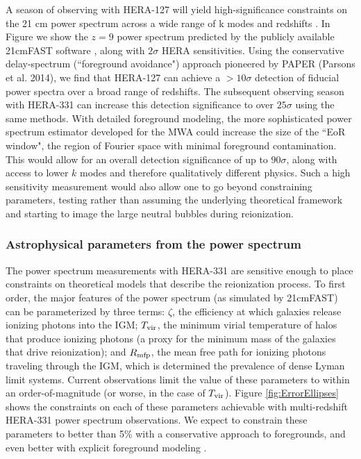 \documentclass[preprint]{aastex}
\begin{document}
A season of observing with HERA-127 will yield high-significance constraints on the 21 cm power spectrum across a wide range of k modes and redshifts \citep{pober_et_al2014}.  In Figure we show the $z=9$ power spectrum predicted by the publicly available 21cmFAST software \citep{mesinger_et_al2011}, along with $2\sigma$ HERA sensitivities.  Using the conservative delay-spectrum (``foreground avoidance") approach pioneered by PAPER (Parsons et al. 2014), we find that HERA-127 can achieve a $> 10\sigma$ detection of fiducial power spectra over a broad range of redshifts.  The subsequent observing season with HERA-331 can increase this detection significance to over $25\sigma$ using the same methods.  With detailed foreground modeling, the more sophisticated power spectrum estimator developed for the MWA could increase the size of the ``EoR window", the region of Fourier space with minimal foreground contamination. This would allow for an overall detection significance of up to $90\sigma$, along with access to lower $k$ modes and therefore qualitatively different physics.  Such a high 
sensitivity measurement would also allow one to go beyond constraining parameters, testing rather than assuming the underlying theoretical framework and starting to image the large neutral bubbles during reionization.

\subsubsection{Astrophysical parameters from the power spectrum}
The power spectrum measurements with HERA-331 are sensitive enough to place constraints on theoretical models that describe the reionization process.  To first order, the major features of the power spectrum (as simulated by 21cmFAST) can be parameterized by three terms: $\zeta$, the efficiency at which galaxies release ionizing photons into the IGM; $T_{\rm vir}$, the minimum virial temperature of halos that produce ionizing photons (a proxy for the minimum mass of the galaxies that drive reionization); and $R_{\rm mfp}$, the mean free path for ionizing photons traveling through the IGM, which is determined the prevalence of dense Lyman limit systems.  Current observations limit the value of these parameters to within an order-of-magnitude (or worse, in the case of $T_{\rm vir}$).  Figure \ref{fig:ErrorEllipses} shows the constraints on each of these parameters achievable with multi-redshift HERA-331 power spectrum observations.  We expect to constrain these parameters to better than 5\% with a conservative 
approach to foregrounds, and even better with explicit foreground modeling \citep{pober_et_al2014}.
\end{document}
